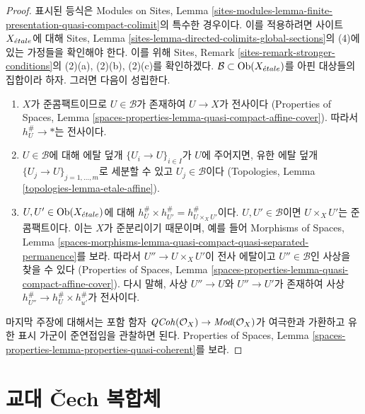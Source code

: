 \begin{proof}
표시된 등식은 Modules on Sites, Lemma
\ref{sites-modules-lemma-finite-presentation-quasi-compact-colimit}의
특수한 경우이다. 이를 적용하려면 사이트 $X_{\acute{e}tale}$에 대해
Sites, Lemma \ref{sites-lemma-directed-colimits-global-sections}의
(4)에 있는 가정들을 확인해야 한다. 이를 위해 Sites, Remark
\ref{sites-remark-stronger-conditions}의 (2)(a), (2)(b), (2)(c)를
확인하겠다. $\mathcal{B} \subset \mathop{\mathrm{Ob}}\nolimits(X_{\acute{e}tale})$를 아핀 대상들의
집합이라 하자. 그러면 다음이 성립한다.
\begin{enumerate}
\item $X$가 준콤팩트이므로 $U \in \mathcal{B}$가 존재하여
$U \to X$가 전사이다
(Properties of Spaces, Lemma
\ref{spaces-properties-lemma-quasi-compact-affine-cover}).
따라서 $h_U^\# \to *$는 전사이다.
\item $U \in \mathcal{B}$에 대해 에탈 덮개
$\{U_i \to U\}_{i \in I}$가 $U$에 주어지면, 유한 에탈 덮개
$\{U_j \to U\}_{j = 1, \ldots, m}$로 세분할 수 있고
$U_j \in \mathcal{B}$이다
(Topologies, Lemma \ref{topologies-lemma-etale-affine}).
\item $U, U' \in \mathop{\mathrm{Ob}}\nolimits(X_{\acute{e}tale})$에 대해
$h_U^\# \times h_{U'}^\# = h_{U \times_X U'}^\#$이다.
$U, U' \in \mathcal{B}$이면 $U \times_X U'$는 준콤팩트이다.
이는 $X$가 준분리이기 때문이며, 예를 들어 Morphisms of Spaces, Lemma
\ref{spaces-morphisms-lemma-quasi-compact-quasi-separated-permanence}를 보라.
따라서 $U'' \to U \times_X U'$이 전사 에탈이고
$U'' \in \mathcal{B}$인 사상을 찾을 수 있다
(Properties of Spaces, Lemma
\ref{spaces-properties-lemma-quasi-compact-affine-cover}).
다시 말해, 사상 $U'' \to U$와 $U'' \to U'$가 존재하여
사상 $h_{U''}^\# \to h_U^\# \times h_{u'}^\#$가 전사이다.
\end{enumerate}
마지막 주장에 대해서는 포함 함자
$\mathit{QCoh}(\mathcal{O}_X) \to \textit{Mod}(\mathcal{O}_X)$가
여극한과 가환하고 유한 표시 가군이 준연접임을 관찰하면 된다.
Properties of Spaces, Lemma
\ref{spaces-properties-lemma-properties-quasi-coherent}를 보라.
\end{proof}





\section{교대 {\v C}ech 복합체}
\label{section-alternating-cech}

